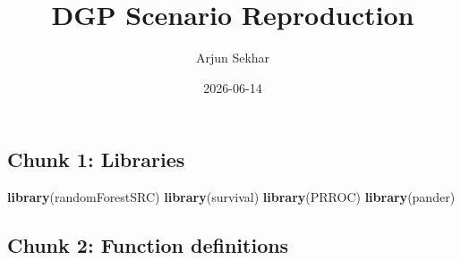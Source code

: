 \documentclass[
]{article}
\title{DGP Scenario Reproduction}
\author{Arjun Sekhar}
\date{2026-06-14}
\newenvironment{Shaded}{\begin{snugshade}}{\end{snugshade}}
\newcommand{\FunctionTok}[1]{\textcolor[rgb]{0.13,0.29,0.53}{\textbf{#1}}}
\newcommand{\NormalTok}[1]{#1}
\begin{document}
\maketitle

\subsection{Chunk 1: Libraries}\label{chunk-1-libraries}

\begin{Shaded}
\begin{Highlighting}[]
\FunctionTok{library}\NormalTok{(randomForestSRC)}
\FunctionTok{library}\NormalTok{(survival)}
\FunctionTok{library}\NormalTok{(PRROC)}
\FunctionTok{library}\NormalTok{(pander)}
\end{Highlighting}
\end{Shaded}

\subsection{Chunk 2: Function
definitions}\label{chunk-2-function-definitions}
\end{document}
